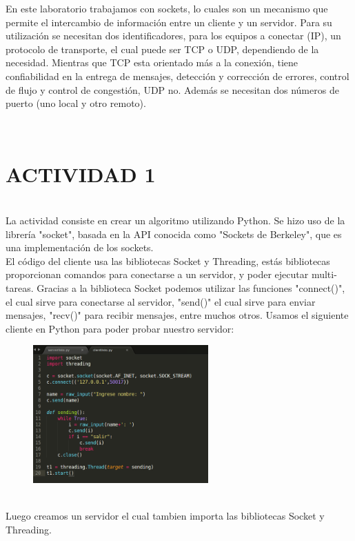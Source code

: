 \documentclass[onecolumn,12pt]{IEEEtran}
\begin{document}
En este laboratorio trabajamos con sockets, lo cuales son un mecanismo que permite el intercambio de información entre un cliente y un servidor. Para su utilización se necesitan dos identificadores, para los equipos a conectar (IP), un protocolo de transporte, el cual puede ser TCP o UDP, dependiendo de la necesidad. Mientras que TCP esta orientado más a la conexión, tiene confiabilidad en la entrega de mensajes, detección y corrección de errores, control de flujo y control de congestión, UDP no. Además se necesitan dos números de puerto (uno local y otro remoto).
 

\hfill \\
\section{ACTIVIDAD 1}
\hfill \\

La actividad consiste en crear un algoritmo utilizando Python. Se hizo uso de la librería "socket", basada en la API conocida como "Sockets de Berkeley", que es una implementación de los sockets.\\

El código del cliente usa las bibliotecas Socket y Threading, estás bibliotecas proporcionan comandos para conectarse a un servidor, y poder ejecutar multi-tareas. Gracias a la biblioteca Socket podemos utilizar las funciones "connect()", el cual sirve para conectarse al servidor, "send()" el cual sirve para enviar mensajes, "recv()" para recibir mensajes, entre muchos otros. Usamos el siguiente cliente en Python para poder probar nuestro servidor:

\begin{figure}[!h]
\centering
\includegraphics[width=0.6\textwidth]{clientesito.png}
\label{fig:mesh1}
\end{figure}
\\
\newpage
Luego creamos un servidor el cual tambien importa las bibliotecas Socket y Threading.
\end{document}
